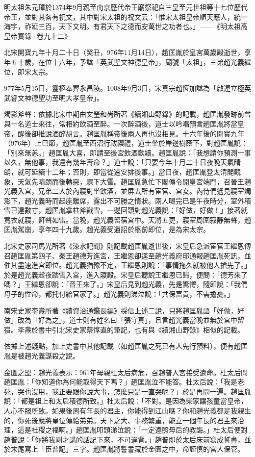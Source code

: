 明太祖朱元璋於1374年9月親至南京歷代帝王廟祭祀自三皇至元世祖等十七位歷代帝王，並對其各有祝文，其中對宋太祖的祝文云：「惟宋太祖皇帝順天應人，統一海宇，祚延三百，天下文明。有君天下之德而安萬世之功者也。」——《明太祖高皇帝實錄·卷九十二》

北宋開寶九年十月二十日（癸丑，976年11月14日），趙匡胤於皇宮萬歲殿逝世，享年五十歲，在位十六年，予諡「英武聖文神德皇帝」，廟號「太祖」，三弟趙光義繼位，即宋太宗。

977年5月15日，靈柩奉葬永昌陵。1008年9月3日，宋真宗趙恆加諡為「啟運立極英武睿文神德聖功至明大孝皇帝」。

燭影斧聲：依據北宋中期由文瑩和尚所著《續湘山野錄》的記載，趙匡胤發跡前曾與一名道士來往，常相約飲酒至醉。一次醉酒後，道士以吟唱預言趙匡胤將當皇帝，醒後卻推說酒醉胡言。趙匡胤稱帝後兩人再也沒相見。十六年後的開寶九年（976年）上巳節，趙匡胤至西沼行祓禊禮，道士坐於岸邊樹蔭下，對趙匡胤說：「別來無恙。」趙匡胤大喜，即請至後宮飲酒歡續。趙匡胤說：「我想請你預測一事以久，無他事，我還有幾年壽命？」道士說：「只要今年十月二十日夜晚天氣晴朗，就可延續十二年；否則，即當從速安排後事。」當日夜，趙匡胤登太清閣觀象，天氣先晴朗而後轉惡，驟下大雪。趙匡胤急忙下閣傳令開皇宮端門，召晉王趙光義入宮，兄弟二人於內寢對坐飲酒，並屏去所有宦官、宮女。內侍們遙見寢室燭影下，趙光義時而起座離席，露出不可勝之情狀。兩人喝完已是午夜時分，室外積雪已達數寸，趙匡胤拿柱斧戳雪，一邊回頭對趙光義說：「好做，好做！」接著就寬衣就寢，鼾聲如雷。當晚，趙光義留宿宮中。天將五更，寢室周圍寂靜無聲，趙匡胤駕崩，享年四十九歲。趙光義受遺詔於柩前即位，是為宋太宗。

北宋史家司馬光所著《涑水記聞》則記載趙匡胤逝世後，宋皇后急派宦官王繼恩傳召趙匡胤第四子、秦王趙德芳進宮，王繼恩卻逕至趙光義府邸通報趙匡胤死訊，並催其盡速進宮即位。趙光義猶豫不定，王繼恩則說：「事情拖久就被他人搶先了。」於是趙光義趁夜踏雪入宮，進入寢殿。宋皇后聽說王繼恩已歸，便問：「德芳來了嗎？」王繼恩卻說：「晉王來了。」宋皇后見到趙光義，先是驚愕，隨即說：「我們母子的性命，都托付給官家了。」趙光義則涕泣說：「共保富貴，不需擔憂。」

南宋史家李燾所著《續資治通鑑長編》採信上述二說，只將趙匡胤語「好做，好做」改為「好為之」，道士則有姓名曰「張守真」，且言趙光義當晚並無於宮中留宿。李燾於書中引北宋史家蔡惇直的筆記，也有與《續湘山野錄》相似的記載。

依據上述疑點，加上史書中其他記載（如趙匡胤之死已有人先行預料），便有趙匡胤是被趙光義謀殺之說。

金匱之盟：趙光義表示：961年母親杜太后病危，召趙普入宮接受遺命。杜太后問趙匡胤：「你知道你為何能取得天下嗎？」趙匡胤泣不能答。杜太后說：「我是老死，哭也沒用，我正要跟你說大事，怎麼只是一直哭呢？」於是再問一遍。趙匡胤說：「都是祖上和太后積德所致。」杜太后說：「不對。是因為柴家讓孩童當皇帝，人心不服所致。如果後周有年長的君主，你能得到江山嗎？你和趙光義都是我親生的，你死後應將皇位傳給弟弟。天下之大、事務繁重，能立一個年長的君主來治理，這是社稷之福啊。」趙匡胤叩頭涕泣說：「一定遵照母后的教誨。」杜太后便對趙普說：「你將我剛才講的話記下來，不可違背。」趙普即於太后床前寫成誓書，並於末尾寫上「臣普記」三字。趙匡胤將誓書藏於金匱之中，命謹慎的宮人保管。

